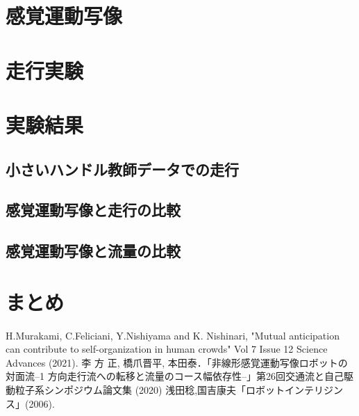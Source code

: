 \documentclass[10pt,a4paper,twocolumn]{jarticle}
\begin{document}
\section{感覚運動写像}

\section{走行実験}

\section{実験結果}
\subsection{小さいハンドル教師データでの走行}

\subsection{感覚運動写像と走行の比較}

\subsection{感覚運動写像と流量の比較}

\section{まとめ}

\begin{thebibliography}{9}
H.Murakami, C.Feliciani, Y.Nishiyama and K. Nishinari,
"Mutual anticipation can contribute to self-organization in human crowds" 
Vol 7 Issue 12 Science Advances (2021).
 李 方 正, 橋爪晋平, 本田泰．「非線形感覚運動写像ロボットの対面流–1 方向走行流への転移と流量のコース幅依存性–」第26回交通流と自己駆動粒子系シンポジウム論文集 (2020)
 浅田稔,国吉康夫「ロボットインテリジンス」(2006).
\end{thebibliography}
\end{document}
